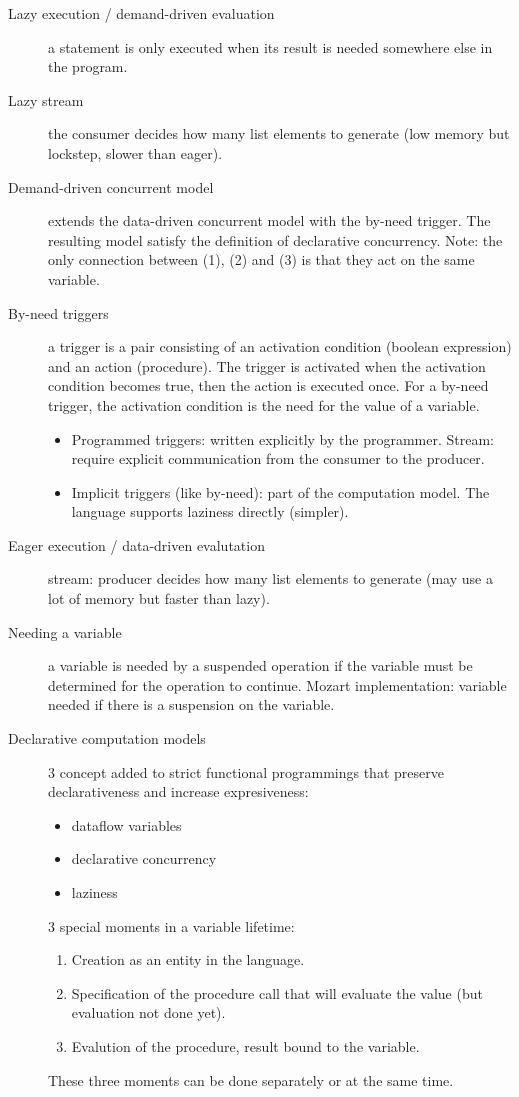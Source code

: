 \begin{description}
  \item[Lazy execution / demand-driven evaluation] a statement is only executed when its result is needed somewhere else in the program.
  \item[Lazy stream] the consumer decides how many list elements to generate (low memory but lockstep, slower than eager).
  \item[Demand-driven concurrent model] extends the data-driven concurrent model with the by-need trigger.
    The resulting model satisfy the definition of declarative concurrency.
    Note: the only connection between (1), (2) and (3) is that they act on the same variable.
  \item[By-need triggers] a trigger is a pair consisting of an activation condition (boolean expression) and an action (procedure).
    The trigger is activated when the activation condition becomes true, then the action is executed once.
    For a by-need trigger, the activation condition is the need for the value of a variable.
    \begin{itemize}
      \item Programmed triggers: written explicitly by the programmer.
        Stream: require explicit communication from the consumer to the producer.
      \item Implicit triggers (like by-need): part of the computation model.
        The language supports laziness directly (simpler).
    \end{itemize}

  \item[Eager execution / data-driven evalutation] stream: producer decides how many list elements to generate (may use a lot of memory but faster than lazy).

  \item[Needing a variable] a variable is needed by a suspended operation if the variable must be determined for the operation to continue.
    Mozart implementation: variable needed if there is a suspension on the variable.

  \item[Declarative computation models]
    3 concept added to strict functional programmings that preserve declarativeness and increase expresiveness:
    \begin{itemize}
      \item dataflow variables
      \item declarative concurrency
      \item laziness
    \end{itemize}
    3 special moments in a variable lifetime:
    \begin{enumerate}
      \item Creation as an entity in the language.
      \item Specification of the procedure call that will evaluate the value (but evaluation not done yet).
      \item Evalution of the procedure, result bound to the variable.
    \end{enumerate}
    These three moments can be done separately or at the same time.
\end{description}



